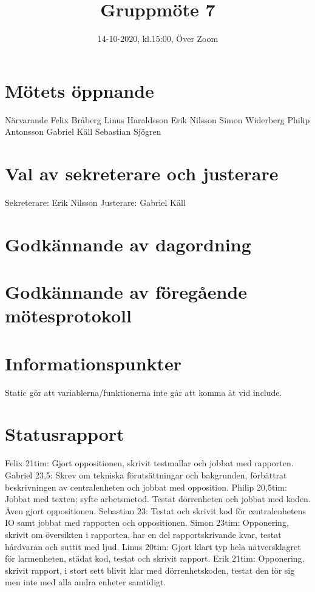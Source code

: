 \documentclass{article}
\title{Gruppmöte 7}
\date{14-10-2020, kl.15:00, Över Zoom}
\begin{document}
 \maketitle

\section{Mötets öppnande} 
Närvarande
Felix Bråberg
Linus Haraldsson
Erik Nilsson
Simon Widerberg
Philip Antonsson
Gabriel Käll
Sebastian Sjögren

\section{Val av sekreterare och justerare} 
Sekreterare: Erik Nilsson
\newline
Justerare: Gabriel Käll

\section{Godkännande av dagordning}

\section{Godkännande av föregående mötesprotokoll} 

\section{Informationspunkter} 
Static gör att variablerna/funktionerna inte går att komma åt vid include.

\section{Statusrapport}
Felix 21tim: Gjort oppositionen, skrivit testmallar och jobbat med rapporten.
\newline\newline
Gabriel 23,5: Skrev om tekniska förutsättningar och bakgrunden, förbättrat beskrivningen av centralenheten och jobbat med opposition.
\newline\newline
Philip 20,5tim: Jobbat med texten; syfte arbetsmetod. Testat dörrenheten och  jobbat med koden. Även gjort oppositionen.
\newline\newline
Sebastian 23: Testat och skrivit kod för centralenhetens IO samt jobbat med rapporten och oppositionen.
\newline\newline
Simon 23tim: Opponering, skrivit om översikten i rapporten, har en del rapportskrivande kvar, testat hårdvaran och suttit med ljud.
\newline\newline
Linus 20tim: Gjort klart typ hela nätversklagret för larmenheten, städat kod, testat och skrivit rapport.
\newline\newline
Erik 21tim: Opponering, skrivit rapport, i stort sett blivit klar med dörrenhetskoden, testat den för sig men inte med alla andra enheter samtidigt.
\end{document}
